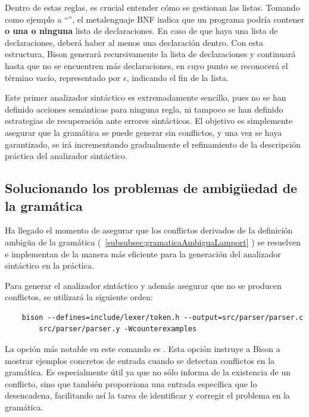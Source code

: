 Dentro de estas reglas, es crucial entender cómo se gestionan las listas. Tomando como ejemplo a ``'', el metalenguaje BNF indica que un programa podría contener \textbf{o una o ninguna} lista de declaraciones. En caso de que haya una lista de declaraciones, deberá haber al menos una declaración dentro. Con esta estructura, Bison generará recursivamente la lista de declaraciones y continuará hasta que no se encuentren más declaraciones, en cuyo punto se reconocerá el término vacío, representado por $\epsilon$, indicando el fin de la lista.

\vspace{0.5cm}

Este primer analizador sintáctico es extremadamente sencillo, pues no se han definido acciones semánticas para ninguna regla, ni tampoco se han definido estrategias de recuperación ante errores sintácticos. El objetivo es simplemente asegurar que la gramática se puede generar sin conflictos, y una vez se haya garantizado, se irá incrementando gradualmente el refinamiento de la descripción práctica del analizador sintáctico.

\subsection{Solucionando los problemas de ambigüedad de la gramática}
Ha llegado el momento de asegurar que los conflictos derivados de la definición ambigüa de la gramática (~\ref{subsubsec:gramaticaAmbiguaLamport} ) se resuelven e implementan de la manera más eficiente para la generación del analizador sintáctico en la práctica.

\vspace{0.5cm}
\noindent
Para generar el analizador sintáctico y además asegurar que no se producen conflictos, se utilizará la siguiente orden:
\begin{verbatim}
    bison --defines=include/lexer/token.h --output=src/parser/parser.c 
        src/parser/parser.y -Wcounterexamples
\end{verbatim}

La opción más notable en este comando es . Esta opción instruye a Bison a mostrar ejemplos concretos de entrada cuando se detectan conflictos en la gramática. Es especialmente útil ya que no sólo informa de la existencia de un conflicto, sino que también proporciona una entrada específica que lo desencadena, facilitando así la tarea de identificar y corregir el problema en la gramática.


